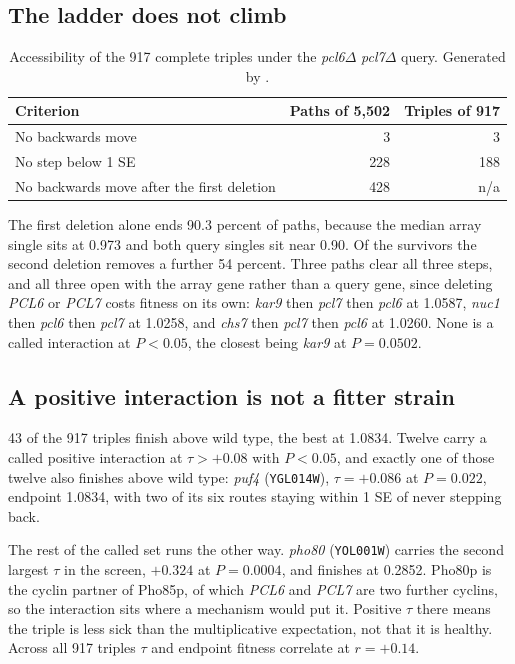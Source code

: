 \subsection{The ladder does not climb}

\begin{table}[H]
\centering
\footnotesize
\begin{tabular}{lrr}
\toprule
Criterion & Paths of 5{,}502 & Triples of 917 \\
\midrule
No backwards move                        & 3   & 3   \\
No step below 1 SE                       & 228 & 188 \\
No backwards move after the first deletion & 428 & n/a \\
\bottomrule
\end{tabular}
\caption{Accessibility of the 917 complete triples under the
\emph{pcl6}$\Delta$ \emph{pcl7}$\Delta$ query. Generated by
\protect{}.}
\end{table}

The first deletion alone ends 90.3 percent of paths, because the median array
single sits at 0.973 and both query singles sit near 0.90. Of the survivors the
second deletion removes a further 54 percent. Three paths clear all three steps,
and all three open with the array gene rather than a query gene, since deleting
\emph{PCL6} or \emph{PCL7} costs fitness on its own: \emph{kar9} then
\emph{pcl7} then \emph{pcl6} at 1.0587, \emph{nuc1} then \emph{pcl6} then
\emph{pcl7} at 1.0258, and \emph{chs7} then \emph{pcl7} then \emph{pcl6} at
1.0260. None is a called interaction at $P < 0.05$, the closest being
\emph{kar9} at $P = 0.0502$.

\subsection{A positive interaction is not a fitter strain}

43 of the 917 triples finish above wild type, the best at 1.0834. Twelve carry a
called positive interaction at $\tau > +0.08$ with $P < 0.05$, and exactly one of
those twelve also finishes above wild type: \emph{puf4} (\texttt{YGL014W}),
$\tau = +0.086$ at $P = 0.022$, endpoint 1.0834, with two of its six routes
staying within 1 SE of never stepping back.

The rest of the called set runs the other way. \emph{pho80} (\texttt{YOL001W})
carries the second largest $\tau$ in the screen, $+0.324$ at $P = 0.0004$, and
finishes at 0.2852. Pho80p is the cyclin partner of Pho85p, of which \emph{PCL6}
and \emph{PCL7} are two further cyclins, so the interaction sits where a
mechanism would put it. Positive $\tau$ there means the triple is less sick than
the multiplicative expectation, not that it is healthy. Across all 917 triples
$\tau$ and endpoint fitness correlate at $r = +0.14$.

